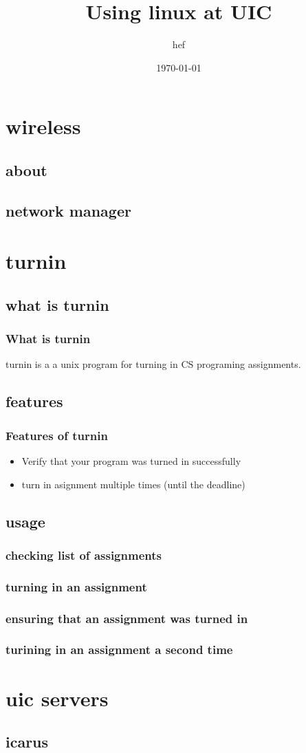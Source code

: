 \documentclass[hyperref={pdfpagelabels=false}]{beamer}
\title{Using linux at UIC}
\author{hef}
\date{\today}
\begin{document}
\frame{\titlepage}
\section[outline]{}
\frame{\tableofcontents}
\section{wireless}
\subsection{about}
\subsection{network manager}
\section{turnin}
\subsection{what is turnin}
\frame
{
    \frametitle{What is turnin}
    turnin is a a unix program for turning in CS programing assignments.
}

\subsection{features}
\frame
{
    \frametitle{Features of turnin}
    \begin{itemize}
    \item{Verify that your program was turned in successfully}
    \item{turn in asignment multiple times (until the deadline)}
    \end{itemize}
}
\subsection{usage}
\frame
{
    \frametitle{checking list of assignments}
}
\frame
{
    \frametitle{turning in an assignment}
}
\frame
{
    \frametitle{ensuring that an assignment was turned in}
}
\frame
{
    \frametitle{turining in an assignment a second time}
}
\section{uic servers}
\subsection{icarus}
\end{document}
